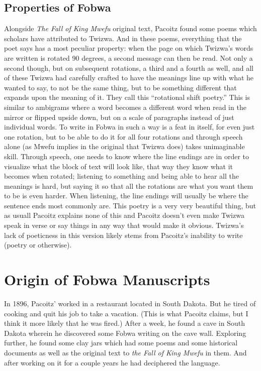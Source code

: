 \section{Properties of Fobwa}
\label{rotshift}
Alongside \emph{The Fall of King Mwefu} original text, Pacoitz found some poems which scholars have attributed to Twizwa. And in these poems, everything that the poet says has a most peculiar property: when the page on which Twizwa's words are written is rotated 90 degrees, a second message can then be read. Not only a second though, but on subsequent rotations, a third and a fourth as well, and all of these Twizwa had carefully crafted to have the meanings line up with what he wanted to say, to not be the same thing, but to be something different that expands upon the meaning of it. They call this ``rotational shift poetry.'' This is similar to ambigrams where a word becomes a different word when read in the mirror or flipped upside down, but on a scale of paragraphs instead of just individual words. To write in Fo\-bwa in such a way is a feat in itself, for even just one rotation, but to be able to do it for all four rotations and through speech alone (as Mwefu implies in the original that Twizwa does) takes unimaginable skill. Through speech, one needs to know where the line endings are in order to visualize what the block of text will look like, that way they know what it becomes when rotated; listening to something and being able to hear all the meanings is hard, but saying it so that all the rotations are what you want them to be is even harder. When listening, the line endings will usually be where the sentence ends most commonly are. This poetry is a very very beautiful thing, but as usuall Pacoitz explains none of this and Pacoitz doesn't even make Twizwa speak in verse or say things in any way that would make it obvious. Twizwa's lack of poeticness in this version likely stems from Pacoitz's inability to write (poetry or otherwise).

\chapter{Origin of Fobwa Manuscripts}
In 1896, Pacoitz' worked in a restaurant located in South Dakota. But he tired of cooking and quit his job to take a vacation. (This is what Pacoitz claims, but I think it more likely that he was fired.) After a week, he found a cave in South Dakota wherein he discovered some Fobwa writing on the cave wall. Exploring further, he found some clay jars which had some poems and some historical documents as well as the original text to \emph{the Fall of King Mwefu} in them. And after working on it for a couple years he had deciphered the language.

